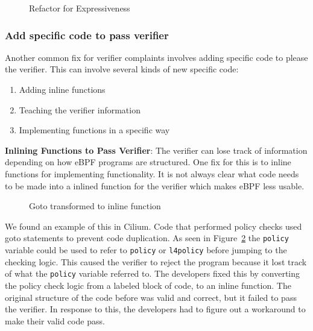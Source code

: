 \begin{figure}
    
    \caption{Refactor for Expressiveness}
    \label{fig:switch}
\end{figure}

\subsubsection{Add specific code to pass verifier}
\label{motivation:add-code}
Another common fix for verifier complaints involves adding specific code to please
    the verifier.
This can involve several kinds of new specific code:

\begin{enumerate}
    \item Adding inline functions
    \item Teaching the verifier information
    \item Implementing functions in a specific way
\end{enumerate}

\noindent\textbf{Inlining Functions to Pass Verifier}:
The verifier can lose track of information depending on how eBPF programs are structured.
One fix for this is to inline functions for implementing functionality.
It is not always clear what code needs to be made into a inlined function for the verifier
    which makes eBPF less usable.

\begin{figure}
    
    \caption{Goto transformed to inline function}
    \label{fig:inline-fig}
\end{figure}

%
%

We found an example of this in Cilium.
Code that performed policy checks used goto statements to prevent code duplication.
As seen in Figure~\ref{fig:inline-fig} the \texttt{policy} variable could be used to refer to \texttt{policy} or \texttt{l4policy} before jumping to the checking logic.
This caused the verifier to reject the program because it lost track of what the \texttt{policy} variable referred to.
The developers fixed this by converting the policy check logic from a labeled block of code, to an inline function.
The original structure of the code before was valid and correct, but it failed to pass the verifier.
In response to this, the developers had to figure out a workaround to make their valid code pass.

